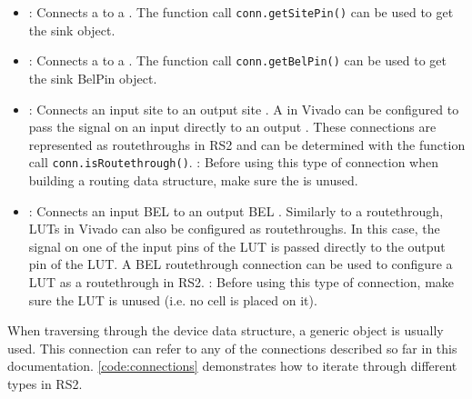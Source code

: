 \begin {itemize}
  
  \item {}: Connects a  to a .
  The function call \texttt{conn.get\-SitePin()} can be used to get the sink
   object.
  \item {}: Connects a  to a . The
  function call \texttt{conn.get\-BelPin()} can be used to get the sink \cls
  {BelPin} object.
  \item {}: Connects an input site 
  to an output site . A  in Vivado can be configured to pass
  the signal on an input  directly to an output .
  These connections are represented as routethroughs in RS2 and can be
  determined with the function call \texttt{conn.isRoutethrough()}.
  : Before using this type of connection when building a
  routing data structure, make sure the  is unused.
  \item {}: Connects an input BEL  to
  an output BEL . Similarly to a  routethrough, LUTs in
  Vivado can also be configured as routethroughs. In this case, the signal on one of the
  input pins of the LUT is passed directly to the output pin of the LUT. A BEL
  routethrough connection can be used to configure a LUT as a routethrough in
  RS2.
  : Before using this type of connection, make sure the LUT is
  unused (i.e. no cell is placed on it).
\end{itemize}

\noindent
When traversing through the device data structure, a generic 
object is usually used. This connection can refer to any of the connections
described so far in this documentation. \autoref{code:connections} demonstrates
how to iterate through different  types in RS2.

